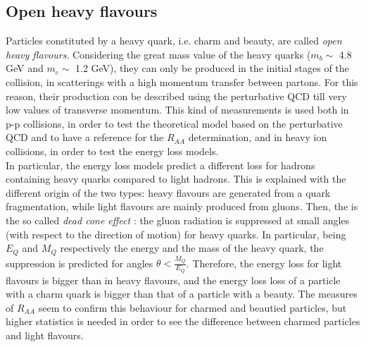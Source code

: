 \subsection{Open heavy flavours}
Particles constituted by a heavy quark, i.e. charm and beauty, are called \textit{open heavy flavours}. Considering the great mass value of the heavy quarks ($m_{b}\sim$ 4.8 GeV and $m_{c}\sim$ 1.2 GeV), they can only be produced in the initial stages of the collision, in scatterings with a high momentum transfer between partons. For this reason, their production con be described using the perturbative QCD till very low values of transverse momentum. This kind of measurements is used both in p-p collisions, in order to test the theoretical model based on the perturbative QCD and to have a reference for the $R_{AA}$ determination, and in heavy ion collisions, in order to test the energy loss models.\\
In particular, the energy loss models predict a different loss for hadrons containing heavy quarks compared to light hadrons. This is explained with the different origin of the two types: heavy flavours are generated from a quark fragmentation, while light flavours are mainly produced from gluons. Then, the is the so called \textit{dead cone effect} \cite{deadcone}: the gluon radiation is suppressed at small angles (with respect to the direction of motion) for heavy quarks. In particular, being $E_{Q}$ and $M_{Q}$ respectively the energy and the mass of the heavy quark, the suppression is predicted for angles $\theta<\frac{M_{Q}}{E_{Q}}$. Therefore, the energy loss for light flavours is bigger than in heavy flavours, and the energy loss loss of a particle with a charm quark is bigger than that of a particle with a beauty. The measures of $R_{AA}$ seem to confirm this behaviour for charmed and beautied particles, but higher statistics is needed in order to see the difference between charmed particles and light flavours.\\
